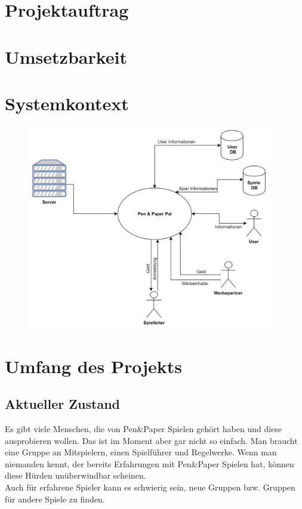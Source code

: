 \documentclass[DIV=13, 10pt,a4paper]{scrartcl}
\begin{document}
\section{Projektauftrag}

\newpage

\section{Umsetzbarkeit}


\section{Systemkontext}
\begin{figure}[h!]
	\centering
	\includegraphics[width = 0.95\textwidth]{docs/0_Sonstiges/03_03_Systemkontext.jpg}
	\label{fig:SystemKontext}
 \end{figure}



\section{Umfang des Projekts}
	\subsection*{Aktueller Zustand}
	Es gibt viele Menschen, die von Pen\&Paper Spielen gehört haben und diese ausprobieren wollen. Das ist im Moment aber gar nicht so einfach. Man braucht eine Gruppe an Mitspielern, einen Spielführer und Regelwerke. Wenn man niemanden kennt, der bereits Erfahrungen mit Pen\&Paper Spielen hat, können diese Hürden unüberwindbar scheinen.\\
	Auch für erfahrene Spieler kann es schwierig sein, neue Gruppen bzw. Gruppen für andere Spiele zu finden. 	
\end{document}
